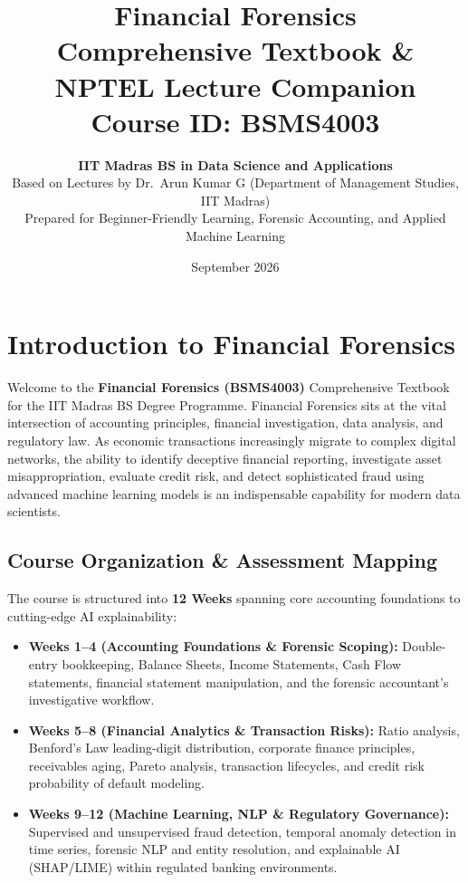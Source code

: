 \documentclass[11pt,a4paper,oneside]{book}
\title{
    \Huge \bfseries \sffamily \color{primarydark} Financial Forensics \\
    \large \vspace{0.3cm} \color{tealdef} Comprehensive Textbook \& NPTEL Lecture Companion \\
    \vspace{0.2cm} \normalsize \color{primarydark} Course ID: BSMS4003
}
\author{
    \textbf{IIT Madras BS in Data Science and Applications} \\
    \small Based on Lectures by Dr.~Arun Kumar G (Department of Management Studies, IIT Madras) \\
    \small Prepared for Beginner-Friendly Learning, Forensic Accounting, and Applied Machine Learning
}
\date{September 2026}
\begin{document}
\maketitle

\frontmatter
\tableofcontents
\newpage

\chapter*{Introduction to Financial Forensics}

Welcome to the \textbf{Financial Forensics (BSMS4003)} Comprehensive Textbook for the IIT Madras BS Degree Programme. Financial Forensics sits at the vital intersection of accounting principles, financial investigation, data analysis, and regulatory law. As economic transactions increasingly migrate to complex digital networks, the ability to identify deceptive financial reporting, investigate asset misappropriation, evaluate credit risk, and detect sophisticated fraud using advanced machine learning models is an indispensable capability for modern data scientists.

\section*{Course Organization \& Assessment Mapping}
The course is structured into \textbf{12 Weeks} spanning core accounting foundations to cutting-edge AI explainability:
\begin{itemize}
    \item \textbf{Weeks 1--4 (Accounting Foundations \& Forensic Scoping):} Double-entry bookkeeping, Balance Sheets, Income Statements, Cash Flow statements, financial statement manipulation, and the forensic accountant's investigative workflow.
    \item \textbf{Weeks 5--8 (Financial Analytics \& Transaction Risks):} Ratio analysis, Benford's Law leading-digit distribution, corporate finance principles, receivables aging, Pareto analysis, transaction lifecycles, and credit risk probability of default modeling.
    \item \textbf{Weeks 9--12 (Machine Learning, NLP \& Regulatory Governance):} Supervised and unsupervised fraud detection, temporal anomaly detection in time series, forensic NLP and entity resolution, and explainable AI (SHAP/LIME) within regulated banking environments.
\end{itemize}
\end{document}
